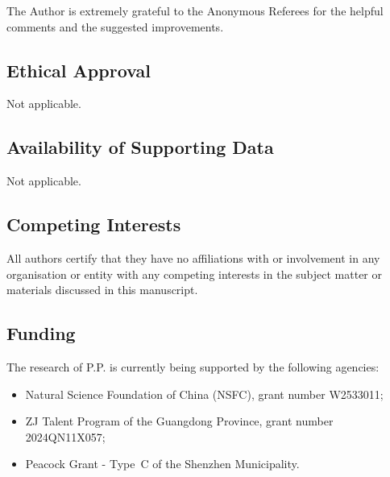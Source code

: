 \documentclass{amsart}
\begin{document}
The Author is extremely grateful to the Anonymous Referees for the helpful comments and the suggested improvements.

\subsection*{Ethical Approval}

Not applicable.

\subsection*{Availability of Supporting Data}

Not applicable.

\subsection*{Competing Interests}

All authors certify that they have no affiliations with or involvement in any organisation or entity with any competing interests in the subject matter or materials discussed in this manuscript.

\subsection*{Funding}

The research of P.P. is currently being supported by the following agencies:
\begin{itemize}
	\item Natural Science Foundation of China (NSFC), grant number W2533011;
	\item ZJ Talent Program of the Guangdong Province, grant number 2024QN11X057;
	\item Peacock Grant - Type~C of the Shenzhen Municipality.
\end{itemize}
	
		
	
\end{document}
